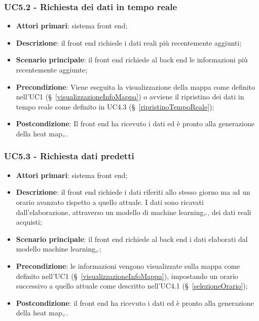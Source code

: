 \subsubsection{UC5.2 - Richiesta dei dati in tempo reale}\label{richiestaDatiTempoReale}
\begin{itemize}
	\item \textbf{Attori primari}: sistema front end;
	\item \textbf{Descrizione}: il front end richiede i dati reali più recentemente aggiunti;
	\item \textbf{Scenario principale}: il front end richiede al back end le informazioni più recentemente aggiunte;
	\item \textbf{Precondizione}: Viene eseguita la visualizzazione della mappa come definito nell’UC1 (\S~\ref{visualizzazioneInfoMappa}) o avviene il ripristino dei dati in tempo reale come definito in UC4.3 (\S~\ref{ripristinoTempoReale});
	\item \textbf{Postcondizione}: Il front end ha ricevuto i dati ed è pronto alla generazione della heat map$_{\scaleto{G}{3pt}}$. 
\end{itemize}

\subsubsection{UC5.3 - Richiesta dati predetti}\label{richiestaDatiPredetti}
\begin{itemize}
	\item \textbf{Attori primari}: sistema front end;
	\item \textbf{Descrizione}: il front end richiede i dati riferiti allo stesso giorno ma ad un orario avanzato rispetto a quello attuale.
	I dati sono ricavati dall’elaborazione, attraverso un modello di machine learning$_{\scaleto{G}{3pt}}$, dei dati reali acquisti;
	\item \textbf{Scenario principale}: il front end richiede al back end i dati elaborati dal modello machine learning$_{\scaleto{G}{3pt}}$;
	\item \textbf{Precondizione}: le informazioni vengono visualizzate sulla mappa come definito nell’UC1 (\S~\ref{visualizzazioneInfoMappa}), impostando un orario successivo a quello attuale come descritto nell’UC4.1 (\S~\ref{selezioneOrario});
	\item \textbf{Postcondizione}: il front end ha ricevuto i dati ed è pronto alla generazione della heat map$_{\scaleto{G}{3pt}}$. 
\end{itemize}

